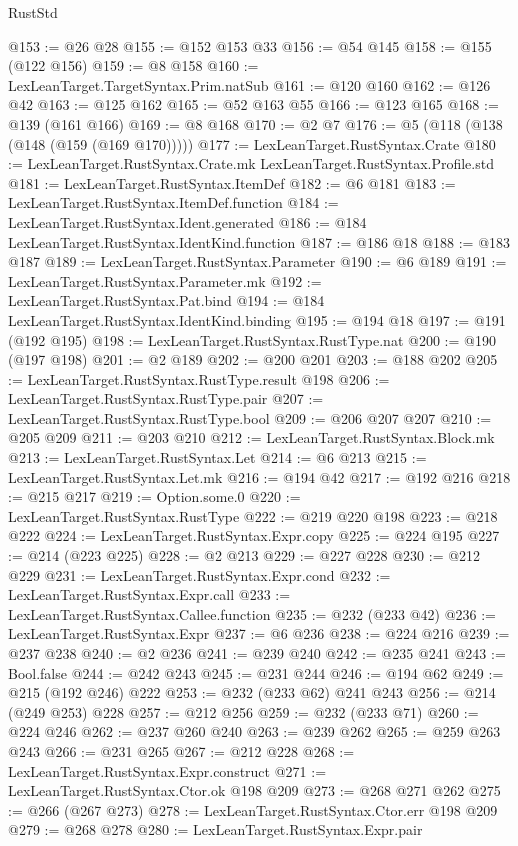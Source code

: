 \begin{lexlean}{RustStd}
\begin{coremodule}
@153 := @26 @28
@155 := @152 @153 @33
@156 := @54 @145
@158 := @155 (@122 @156)
@159 := @8 @158
@160 := LexLeanTarget.TargetSyntax.Prim.natSub
@161 := @120 @160
@162 := @126 @42
@163 := @125 @162
@165 := @52 @163 @55
@166 := @123 @165
@168 := @139 (@161 @166)
@169 := @8 @168
@170 := @2 @7
@176 := @5 (@118 (@138 (@148 (@159 (@169 @170)))))
@177 := LexLeanTarget.RustSyntax.Crate
@180 := LexLeanTarget.RustSyntax.Crate.mk LexLeanTarget.RustSyntax.Profile.std
@181 := LexLeanTarget.RustSyntax.ItemDef
@182 := @6 @181
@183 := LexLeanTarget.RustSyntax.ItemDef.function
@184 := LexLeanTarget.RustSyntax.Ident.generated
@186 := @184 LexLeanTarget.RustSyntax.IdentKind.function
@187 := @186 @18
@188 := @183 @187
@189 := LexLeanTarget.RustSyntax.Parameter
@190 := @6 @189
@191 := LexLeanTarget.RustSyntax.Parameter.mk
@192 := LexLeanTarget.RustSyntax.Pat.bind
@194 := @184 LexLeanTarget.RustSyntax.IdentKind.binding
@195 := @194 @18
@197 := @191 (@192 @195)
@198 := LexLeanTarget.RustSyntax.RustType.nat
@200 := @190 (@197 @198)
@201 := @2 @189
@202 := @200 @201
@203 := @188 @202
@205 := LexLeanTarget.RustSyntax.RustType.result @198
@206 := LexLeanTarget.RustSyntax.RustType.pair
@207 := LexLeanTarget.RustSyntax.RustType.bool
@209 := @206 @207 @207
@210 := @205 @209
@211 := @203 @210
@212 := LexLeanTarget.RustSyntax.Block.mk
@213 := LexLeanTarget.RustSyntax.Let
@214 := @6 @213
@215 := LexLeanTarget.RustSyntax.Let.mk
@216 := @194 @42
@217 := @192 @216
@218 := @215 @217
@219 := Option.some.{0}
@220 := LexLeanTarget.RustSyntax.RustType
@222 := @219 @220 @198
@223 := @218 @222
@224 := LexLeanTarget.RustSyntax.Expr.copy
@225 := @224 @195
@227 := @214 (@223 @225)
@228 := @2 @213
@229 := @227 @228
@230 := @212 @229
@231 := LexLeanTarget.RustSyntax.Expr.cond
@232 := LexLeanTarget.RustSyntax.Expr.call
@233 := LexLeanTarget.RustSyntax.Callee.function
@235 := @232 (@233 @42)
@236 := LexLeanTarget.RustSyntax.Expr
@237 := @6 @236
@238 := @224 @216
@239 := @237 @238
@240 := @2 @236
@241 := @239 @240
@242 := @235 @241
@243 := Bool.false
@244 := @242 @243
@245 := @231 @244
@246 := @194 @62
@249 := @215 (@192 @246) @222
@253 := @232 (@233 @62) @241 @243
@256 := @214 (@249 @253) @228
@257 := @212 @256
@259 := @232 (@233 @71)
@260 := @224 @246
@262 := @237 @260 @240
@263 := @239 @262
@265 := @259 @263 @243
@266 := @231 @265
@267 := @212 @228
@268 := LexLeanTarget.RustSyntax.Expr.construct
@271 := LexLeanTarget.RustSyntax.Ctor.ok @198 @209
@273 := @268 @271 @262
@275 := @266 (@267 @273)
@278 := LexLeanTarget.RustSyntax.Ctor.err @198 @209
@279 := @268 @278
@280 := LexLeanTarget.RustSyntax.Expr.pair

\end{coremodule}
\end{lexlean}
